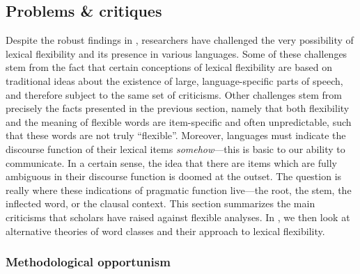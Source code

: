 \subsection{Problems \& critiques}
\label{sec:2.3.3}

Despite the robust findings in , researchers have challenged the very possibility of lexical flexibility and its presence in various languages. Some of these challenges stem from the fact that certain conceptions of lexical flexibility are based on traditional ideas about the existence of large, language-specific parts of speech, and therefore subject to the same set of criticisms. Other challenges stem from precisely the facts presented in the previous section, namely that both flexibility and the meaning of flexible words are item-specific and often unpredictable, such that these words are not truly \enquote{flexible}. Moreover, languages must indicate the discourse function of their lexical items \emph{somehow}—this is basic to our ability to communicate. In a certain sense, the idea that there are items which are fully ambiguous in their discourse function is doomed at the outset. The question is really where these indications of pragmatic function live—the root, the stem, the inflected word, or the clausal context. This section summarizes the main criticisms that scholars have raised against flexible analyses. In , we then look at alternative theories of word classes and their approach to lexical flexibility.

\subsubsection{Methodological opportunism}
\label{sec:2.3.3.1}

